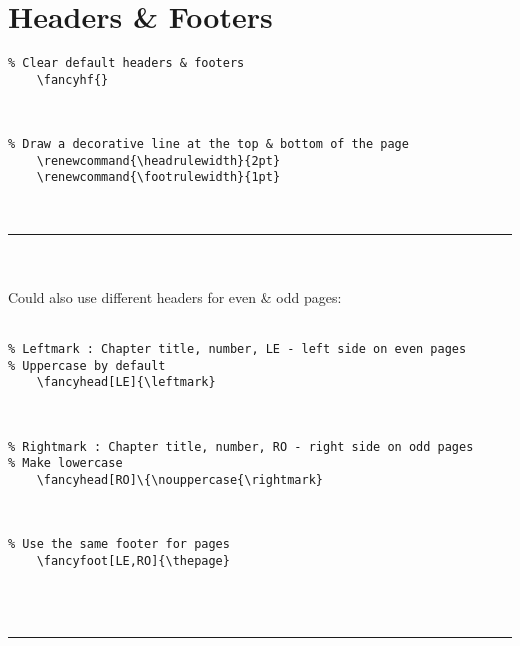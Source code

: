 \documentclass[a4paper,12pt,titlepage]{article}
\begin{document}
\section{Headers \& Footers}
\begin{lstlisting}
% Clear default headers & footers
	\fancyhf{}
\end{lstlisting}
~\\
\begin{lstlisting}
% Draw a decorative line at the top & bottom of the page
	\renewcommand{\headrulewidth}{2pt}
	\renewcommand{\footrulewidth}{1pt}
\end{lstlisting}
~\\
\rule{\linewidth}{0.1mm}
\\
\\Could also use different headers for even \& odd pages:
\\
\\
\begin{lstlisting}
% Leftmark : Chapter title, number, LE - left side on even pages
% Uppercase by default
	\fancyhead[LE]{\leftmark}
\end{lstlisting}
~\\
\begin{lstlisting}
% Rightmark : Chapter title, number, RO - right side on odd pages
% Make lowercase
	\fancyhead[RO]\{\nouppercase{\rightmark}
\end{lstlisting}
~\\
\begin{lstlisting}
% Use the same footer for pages
	\fancyfoot[LE,RO]{\thepage}
\end{lstlisting}
~\\
\\
\rule{\linewidth}{0.1mm}




\end{document}
